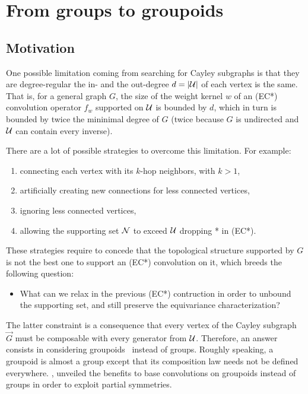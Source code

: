 \section{From groups to groupoids}
\label{sec:2.4}

\subsection{Motivation}

One possible limitation coming from searching for Cayley subgraphs is that they are degree-regular \ie the in- and the out-degree $d = |\mathcal{U}|$ of each vertex is the same. That is, for a general graph $G$, the size of the weight kernel $w$ of an (EC*) convolution operator $f_w$ supported on $\mathcal{U}$ is bounded by $d$, which in turn is bounded by twice the mininimal degree of $G$ (twice because $G$ is undirected and $\mathcal{U}$ can contain every inverse).

There are a lot of possible strategies to overcome this limitation. For example:
\begin{enumerate}
  \item connecting each vertex with its $k$-hop neighbors, with $k > 1$,
  \item artificially creating new connections for less connected vertices,
  \item ignoring less connected vertices,
  \item allowing the supporting set $\mathcal{N}$ to exceed $\mathcal{U}$ \ie dropping * in (EC*).
\end{enumerate}

These strategies require to concede that the topological structure supported by $G$ is not the best one to support an (EC*) convolution on it, which breeds the following question:
\begin{itemize}
  \item What can we relax in the previous (EC*) contruction in order to unbound the supporting set, and still preserve the equivariance characterization?
\end{itemize}

The latter constraint is a consequence that every vertex of the Cayley subgraph $\vec{G}$ must be composable with every generator from $\mathcal{U}$. Therefore, an answer consists in considering groupoids~\citep{brandt1927verallgemeinerung} instead of groups. Roughly speaking, a groupoid is almost a group except that its composition law needs not be defined everywhere. \cite{weinstein1996groupoids}, unveiled the benefits to base convolutions on groupoids instead of groups in order to exploit partial symmetries.

